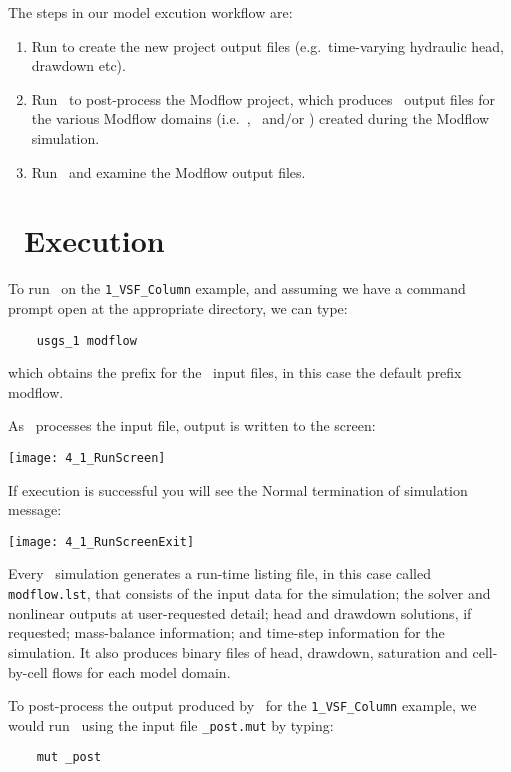 \label{chapter:ModelExecution}
The steps in our model excution  workflow are:
\begin{enumerate}
    \item Run \mfus to create the new project output files (e.g.\ time-varying hydraulic head, drawdown etc).\label{step:modflow}
    \item Run \mut\ to post-process the Modflow project, which produces \tecplot\ output files for the various Modflow domains (i.e.\ \gwf, \swf\ and/or \cln ) created during the Modflow simulation.\label{step:mut2}
    \item Run \tecplot\ and examine the Modflow output files.   \label{step:Tecplot2}
\end{enumerate}

\section{\mfus\ Execution}
To run \mfus\ on the \texttt{1\_VSF\_Column} example, and assuming we have a command prompt open at the appropriate directory, we can type:
\begin{verbatim}
    usgs_1 modflow
\end{verbatim}
which obtains the prefix for the \mfus\ input files, in this case the default prefix {\sf modflow}.

 As \mfus\ processes the input file, output is written to the screen:

        \texttt{[image: 4\_1\_RunScreen]}

 If execution is successful you will see the {\sf Normal termination of simulation} message:

        \texttt{[image: 4\_1\_RunScreenExit]}

 Every \mfus\ simulation generates a run-time
listing file, in this case called {\tt modflow.lst}, that consists of the input data for the simulation;
the solver and nonlinear outputs at user-requested detail; head
and drawdown solutions, if requested; mass-balance information; and time-step information for the simulation.  It also produces binary files of head, drawdown, saturation and cell-by-cell flows for each model domain.

To post-process the output produced by \mfus\ for the \texttt{1\_VSF\_Column} example, we would  run \mut\ using the input file \texttt{\_post.mut} by typing:
\begin{verbatim}
    mut _post
\end{verbatim}

